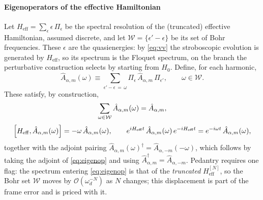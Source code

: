 \documentclass[a4paper,11pt]{article}
\newcommand{\eff}{\mathrm{eff}}
\begin{document}
\paragraph{Eigenoperators of the effective Hamiltonian}
Let $H_\eff = \sum_\epsilon \epsilon\,\Pi_\epsilon$ be the spectral resolution of the (truncated) effective Hamiltonian, assumed discrete, and let $\mathcal W = \{\epsilon' - \epsilon\}$ be its set of Bohr frequencies. These $\epsilon$ are the quasienergies: by \cref{eq:vv} the stroboscopic evolution is generated by $H_\eff$, so its spectrum is the Floquet spectrum, on the branch the perturbative construction selects by starting from $H_0$. Define, for each harmonic,
\begin{equation}\label{eq:eigenop}
  \hat A_{\alpha,m}(\omega) \equiv \sum_{\epsilon'-\epsilon\,=\,\omega} \Pi_\epsilon\,\hat A_{\alpha,m}\,\Pi_{\epsilon'},
  \qquad \omega\in\mathcal W .
\end{equation}
These satisfy, by construction,
\begin{equation}\label{eq:eigenopprops}
  \begin{gathered}
  \sum_{\omega\in\mathcal W}\hat A_{\alpha,m}(\omega) = \hat A_{\alpha,m},\\[3pt]
  \comm{H_\eff}{\hat A_{\alpha,m}(\omega)} = -\omega\,\hat A_{\alpha,m}(\omega),
  \qquad
  e^{iH_\eff t}\,\hat A_{\alpha,m}(\omega)\,e^{-iH_\eff t} = e^{-i\omega t}\,\hat A_{\alpha,m}(\omega),
  \end{gathered}
\end{equation}
together with the adjoint pairing $\hat A_{\alpha,m}(\omega)^\dagger = \hat A_{\alpha,-m}(-\omega)$, which follows by taking the adjoint of \cref{eq:eigenop} and using $\hat A_{\alpha,m}^\dagger = \hat A_{\alpha,-m}$. Pedantry requires one flag: the spectrum entering \cref{eq:eigenop} is that of the \emph{truncated} $H_\eff^{[N]}$, so the Bohr set $\mathcal W$ moves by $\mathcal O(\omega_d^{-N})$ as $N$ changes; this displacement is part of the frame error and is priced with it.
\end{document}
